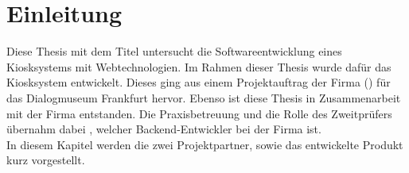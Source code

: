 \chapter{Einleitung}
\label{chap:einleitung}

Diese Thesis mit dem Titel \emph{\getTitle{}} untersucht die Softwareentwicklung eines 
Kiosksystems mit Webtechnologien. Im Rahmen dieser Thesis wurde dafür das Kiosksystem
\emph{\shst{}} entwickelt. Dieses ging aus einem Projektauftrag der Firma 
\mesoFull{} (\meso{}) für das Dialogmuseum Frankfurt hervor. Ebenso ist diese Thesis in
Zusammenarbeit mit der Firma \meso{} entstanden. Die Praxisbetreuung und die Rolle
des Zweitprüfers übernahm dabei \getAdvisor{}, welcher Backend-Entwickler
bei der Firma \meso{} ist.\\

In diesem Kapitel werden die zwei Projektpartner, sowie das entwickelte Produkt kurz
vorgestellt.



